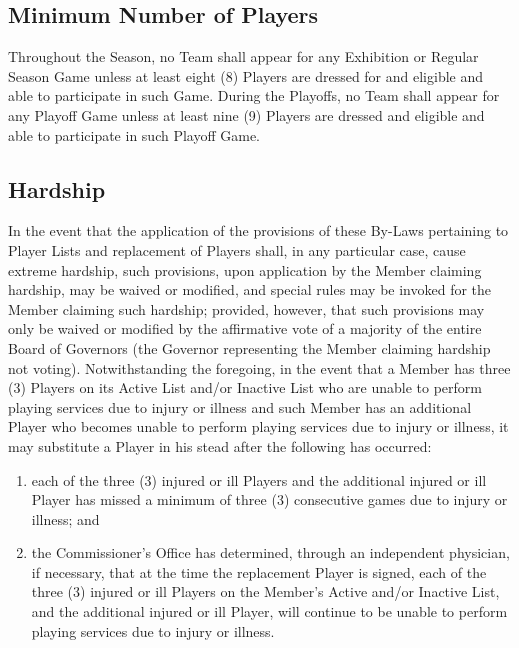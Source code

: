 \documentclass[]{book}
\providecommand{\tightlist}{%
  \setlength{\itemsep}{0pt}\setlength{\parskip}{0pt}}
\theoremstyle{definition}
\theoremstyle{definition}
\theoremstyle{definition}
\theoremstyle{remark}
\begin{document}
\subsection{Minimum Number of Players}\label{minimum-number-of-players}

Throughout the Season, no Team shall appear for any Exhibition or
Regular Season Game unless at least eight (8) Players are dressed for
and eligible and able to participate in such Game. During the Playoffs,
no Team shall appear for any Playoff Game unless at least nine (9)
Players are dressed and eligible and able to participate in such Playoff
Game.

\subsection{Hardship}\label{hardship}

In the event that the application of the provisions of these By-Laws
pertaining to Player Lists and replacement of Players shall, in any
particular case, cause extreme hardship, such provisions, upon
application by the Member claiming hardship, may be waived or modified,
and special rules may be invoked for the Member claiming such hardship;
provided, however, that such provisions may only be waived or modified
by the affirmative vote of a majority of the entire Board of Governors
(the Governor representing the Member claiming hardship not voting).
Notwithstanding the foregoing, in the event that a Member has three (3)
Players on its Active List and/or Inactive List who are unable to
perform playing services due to injury or illness and such Member has an
additional Player who becomes unable to perform playing services due to
injury or illness, it may substitute a Player in his stead after the
following has occurred:

\begin{enumerate}
\def\labelenumi{(\alph{enumi})}
\tightlist
\item
  each of the three (3) injured or ill Players and the additional
  injured or ill Player has missed a minimum of three (3) consecutive
  games due to injury or illness; and
\item
  the Commissioner's Office has determined, through an independent
  physician, if necessary, that at the time the replacement Player is
  signed, each of the three (3) injured or ill Players on the Member's
  Active and/or Inactive List, and the additional injured or ill Player,
  will continue to be unable to perform playing services due to injury
  or illness.
\end{enumerate}
\end{document}
